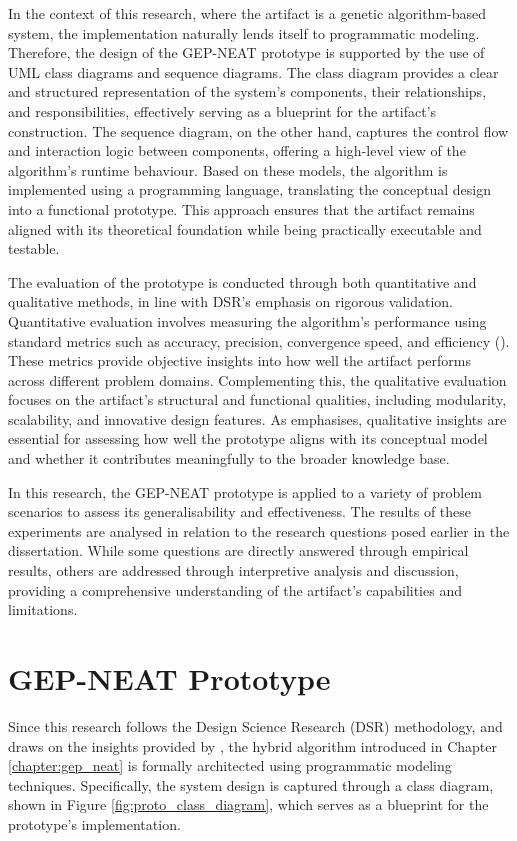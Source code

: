 \parbreak\noindent In the context of this research, where the artifact is a genetic algorithm-based system, the implementation naturally lends itself to programmatic modeling. Therefore, the design of the GEP-NEAT prototype is supported by the use of UML class diagrams and sequence diagrams. The class diagram provides a clear and structured representation of the system's components, their relationships, and responsibilities, effectively serving as a blueprint for the artifact's construction. The sequence diagram, on the other hand, captures the control flow and interaction logic between components, offering a high-level view of the algorithm's runtime behaviour. Based on these models, the algorithm is implemented using a programming language, translating the conceptual design into a functional prototype. This approach ensures that the artifact remains aligned with its theoretical foundation while being practically executable and testable.

\parbreak\noindent The evaluation of the prototype is conducted through both quantitative and qualitative methods, in line with DSR's emphasis on rigorous validation. Quantitative evaluation involves measuring the algorithm's performance using standard metrics such as accuracy, precision, convergence speed, and efficiency (\cite{gregar2023research}). These metrics provide objective insights into how well the artifact performs across different problem domains. Complementing this, the qualitative evaluation focuses on the artifact's structural and functional qualities, including modularity, scalability, and innovative design features. As \cite{olivier2009information} emphasises, qualitative insights are essential for assessing how well the prototype aligns with its conceptual model and whether it contributes meaningfully to the broader knowledge base.

\parbreak\noindent In this research, the GEP-NEAT prototype is applied to a variety of problem scenarios to assess its generalisability and effectiveness. The results of these experiments are analysed in relation to the research questions posed earlier in the dissertation. While some questions are directly answered through empirical results, others are addressed through interpretive analysis and discussion, providing a comprehensive understanding of the artifact's capabilities and limitations.

\section{GEP-NEAT Prototype}\label{sec:proto_proto}
Since this research follows the Design Science Research (DSR) methodology, and draws on the insights provided by \cite{olivier2009information}, the hybrid algorithm introduced in Chapter \ref{chapter:gep_neat} is formally architected using programmatic modeling techniques. Specifically, the system design is captured through a class diagram, shown in Figure \ref{fig:proto_class_diagram}, which serves as a blueprint for the prototype's implementation.

